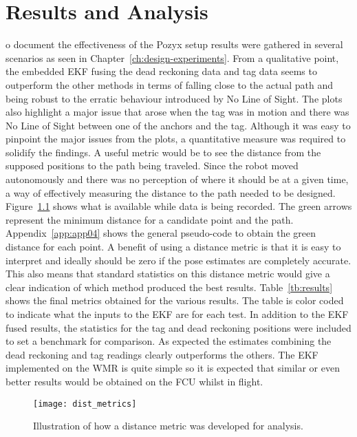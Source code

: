 \chapter{Results and Analysis}\label{ch:results-and-analysis}
o document the effectiveness of the Pozyx setup results were gathered in several scenarios as seen in Chapter~\ref{ch:design-experiments}.
From a qualitative point, the embedded EKF fusing the dead reckoning data and tag data seems to outperform the other methods in terms of falling close to the actual path and being robust to the erratic behaviour introduced by No Line of Sight.
The plots also highlight a major issue that arose when the tag was in motion and there was No Line of Sight between one of the anchors and the tag.
Although it was easy to pinpoint the major issues from the plots, a quantitative measure was required to solidify the findings.
A useful metric would be to see the distance from the supposed positions to the path being traveled.
Since the robot moved autonomously and there was no perception of where it should be at a given time, a way of effectively measuring the distance to the path needed to be designed.
Figure~\ref{fig:dist} shows what is available while data is being recorded.
The green arrows represent the minimum distance for a candidate point and the path.
Appendix~\ref{app:app04} shows the general pseudo-code to obtain the green distance for each point.
A benefit of using a distance metric is that it is easy to interpret and ideally should be zero if the pose estimates are completely accurate.
This also means that standard statistics on this distance metric would give a clear indication of which method produced the best results.
Table~\ref{tb:results} shows the final metrics obtained for the various results.
The table is color coded to indicate what the inputs to the EKF are for each test.
In addition to the EKF fused results, the statistics for the tag and dead reckoning positions were included to set a benchmark for comparison.
As expected the estimates combining the dead reckoning and tag readings clearly outperforms the others.
The EKF implemented on the WMR is quite simple so it is expected that similar or even better results would be obtained on the FCU whilst in flight.

\begin{figure}[h!]
    \centering
    \texttt{[image: dist\_metrics]}
    \caption{Illustration of how a distance metric was developed for analysis.}
    \label{fig:dist}
\end{figure}



